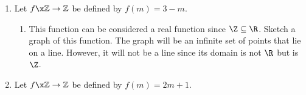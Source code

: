 \begin{enumerate}
%
%
%

\item Let  $f\x \mathbb{Z} \to \mathbb{Z}$ be defined by  $f( m ) = 3 - m$. \label{exer61:integerfunction}

\begin{enumerate}
  \yitem Evaluate  $f( { - 7} ), f( { - 3} ), f( 3 ), \text{ and }f( 7 )$.

  \yitem Determine the set of all of the preimages of  5 and the set of all of the preimages of 4. 

  \yitem Determine the range of the function  $f$\!.

  \item This function can be considered a real function since  $\Z \subseteq \R$.  Sketch a graph of this function. \note The graph will be an infinite set of points that lie on a line.  However, it will not be a line since its domain is not $\R$ but is $\Z$. 
\label{exer:sec61-real}
\end{enumerate}

\item Let  $f\x \mathbb{Z} \to \mathbb{Z}$ be defined by $f( m ) = 2m + 1$. \label{exer:sec61-5}


\end{enumerate}
